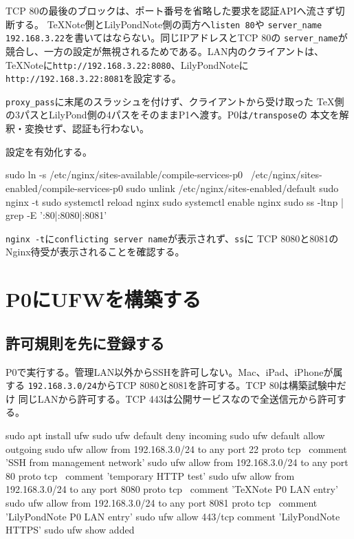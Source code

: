 \documentclass[uplatex,a4paper,11pt]{jsarticle}
\begin{document}
TCP 80の最後のブロックは、ポート番号を省略した要求を認証APIへ流さず切断する。
TeXNote側とLilyPondNote側の両方へ\texttt{listen 80}や
\texttt{server\_name 192.168.3.22}を書いてはならない。同じIPアドレスとTCP 80の
\texttt{server\_name}が競合し、一方の設定が無視されるためである。LAN内のクライアントは、
TeXNoteに\texttt{http://192.168.3.22:8080}、LilyPondNoteに
\texttt{http://192.168.3.22:8081}を設定する。

\texttt{proxy\_pass}に末尾のスラッシュを付けず、クライアントから受け取った
TeX側の3パスとLilyPond側の4パスをそのままP1へ渡す。P0は\texttt{/transpose}の
本文を解釈・変換せず、認証も行わない。

設定を有効化する。

\begin{command}
sudo ln -s /etc/nginx/sites-available/compile-services-p0 \
  /etc/nginx/sites-enabled/compile-services-p0
sudo unlink /etc/nginx/sites-enabled/default
sudo nginx -t
sudo systemctl reload nginx
sudo systemctl enable nginx
sudo ss -ltnp | grep -E ':80|:8080|:8081'
\end{command}

\texttt{nginx -t}に\texttt{conflicting server name}が表示されず、\texttt{ss}に
TCP 8080と8081のNginx待受が表示されることを確認する。

\section{P0にUFWを構築する}

\subsection{許可規則を先に登録する}

P0で実行する。管理LAN以外からSSHを許可しない。Mac、iPad、iPhoneが属する
\texttt{192.168.3.0/24}からTCP 8080と8081を許可する。TCP 80は構築試験中だけ
同じLANから許可する。TCP 443は公開サービスなので全送信元から許可する。

\begin{command}
sudo apt install ufw
sudo ufw default deny incoming
sudo ufw default allow outgoing
sudo ufw allow from 192.168.3.0/24 to any port 22 proto tcp \
  comment 'SSH from management network'
sudo ufw allow from 192.168.3.0/24 to any port 80 proto tcp \
  comment 'temporary HTTP test'
sudo ufw allow from 192.168.3.0/24 to any port 8080 proto tcp \
  comment 'TeXNote P0 LAN entry'
sudo ufw allow from 192.168.3.0/24 to any port 8081 proto tcp \
  comment 'LilyPondNote P0 LAN entry'
sudo ufw allow 443/tcp comment 'LilyPondNote HTTPS'
sudo ufw show added
\end{command}
\end{document}
